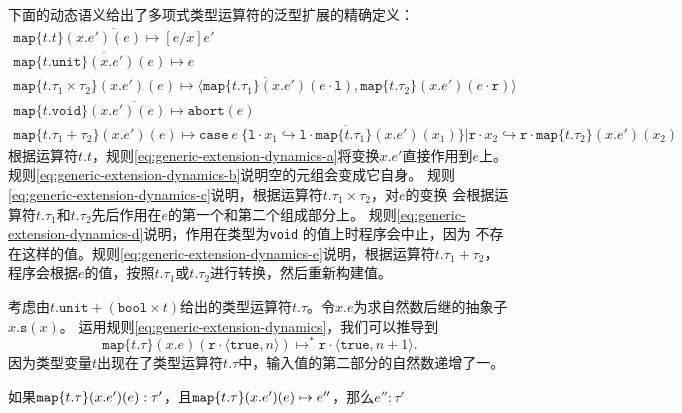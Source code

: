 下面的动态语义给出了多项式类型运算符的泛型扩展的精确定义：
\begin{subequations} \label{eq:generic-extension-dynamics}
	\begin{gather}
	\overline{\texttt{map}\{t.t\}(x.e')(e)\mapsto [e/x]e'} \label{eq:generic-extension-dynamics-a} \\
	\overline{\texttt{map}\{t.\texttt{unit}\}(x.e')(e)\mapsto e} \label{eq:generic-extension-dynamics-b}\\
	\overline{\texttt{map}\{t.\tau_1\times\tau_2\}(x.e')(e)
			  \mapsto
			  \langle\texttt{map}\{t.\tau_1\}(x.e')(e\cdot \texttt{l}),\texttt{map}\{t.\tau_2\}(x.e')(e\cdot \texttt{r})\rangle} \label{eq:generic-extension-dynamics-c}\\
	\overline{\texttt{map}\{t.\texttt{void}\}(x.e')(e)\mapsto\texttt{abort}(e)} \label{eq:generic-extension-dynamics-d}\\
	\overline{\texttt{map}\{t.\tau_1+\tau_2\}(x.e')(e)\mapsto
	          \texttt{case}\ e\ \{\texttt{l}\cdot x_1\hookrightarrow\texttt{l}\cdot\texttt{map}\{t.\tau_1\}(x.e')(x_1)\}|
               \texttt{r}\cdot x_2\hookrightarrow\texttt{r}\cdot\texttt{map}\{t.\tau_2\}(x.e')(x_2)} \label{eq:generic-extension-dynamics-e}
	\end{gather}
\end{subequations}
根据运算符$t.t$，规则\ref{eq:generic-extension-dynamics-a}将变换$x.e'$直接作用到$e$上。
规则\ref{eq:generic-extension-dynamics-b}说明空的元组会变成它自身。
规则\ref{eq:generic-extension-dynamics-c}说明，根据运算符$t.\tau _1\times\tau_2$，对$e$的变换
会根据运算符$t.\tau_1$和$t.\tau_2$先后作用在$e$的第一个和第二个组成部分上。
规则\ref{eq:generic-extension-dynamics-d}说明，作用在类型为\texttt{void} 的值上时程序会中止，因为
不存在这样的值。规则\ref{eq:generic-extension-dynamics-e}说明，根据运算符$t.\tau_1+\tau_2$，
程序会根据$e$的值，按照$t.\tau_1$或$t.\tau_2$进行转换，然后重新构建值。

考虑由$t.\texttt{unit}+(\texttt{bool}\times t)$给出的类型运算符$t.\tau$。令$x.e$为求自然数后继的抽象子$x.\texttt{s}(x)$。
运用规则\ref{eq:generic-extension-dynamics}，我们可以推导到
$$\texttt{map}\{t.\tau\}(x.e)(\texttt{r}\cdot\langle\texttt{true},n\rangle)\mapsto^*
\texttt{r}\cdot\langle\texttt{true},n+1\rangle.$$
因为类型变量$t$出现在了类型运算符$t.\tau$中，输入值的第二部分的自然数递增了一。

\begin{theorem}[保留定理]\label{theorem:generic-extension-preservation}
	如果$\normalfont\texttt{map}\{t.\tau\}(x.e')(e):\tau'$，且$\normalfont\texttt{map}\{t.\tau\}(x.e')(e)\mapsto e''$，那么$e'':\tau'$
\end{theorem}

